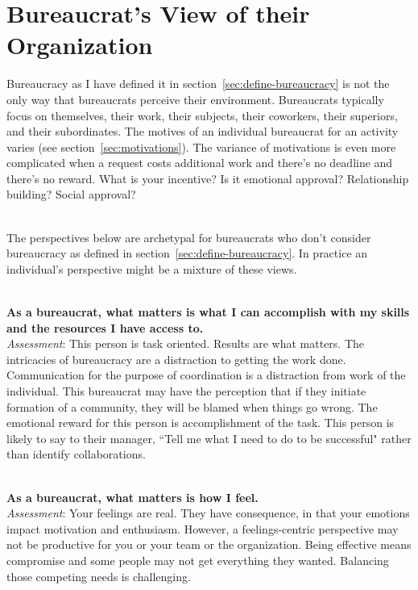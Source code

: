 \section{Bureaucrat's View of their Organization\label{sec:alternative-views-from-within}}

Bureaucracy as I have defined it in section~\ref{sec:define-bureaucracy} is not the only way that bureaucrats perceive their environment. Bureaucrats typically focus on themselves, their work, their subjects, their coworkers, their superiors, and their subordinates. The motives of an individual bureaucrat for an activity varies (see section~\ref{sec:motivations}). The variance of motivations is even more complicated when a request costs additional work and there's no deadline and there's no reward. What is your incentive? Is it emotional approval? Relationship building? Social approval?

\ \\

The perspectives below are archetypal for bureaucrats who don't consider bureaucracy as defined in section~\ref{sec:define-bureaucracy}. In practice an individual's perspective might be a mixture of these views.

\ \\
\textbf{As a bureaucrat, what matters is what I can accomplish with my skills and the resources I have access to.} \\
\textit{Assessment}: This person is task oriented. Results are what matters. The intricacies of bureaucracy are a distraction to getting the work done. 
Communication  for the purpose of coordination is a distraction from work of the individual. 
This bureaucrat may have the perception that if they initiate formation of a community, they will be blamed when things go wrong.
The emotional reward for this person is accomplishment of the task. This person is likely to say to their manager, ``Tell me what I need to do to be successful" rather than identify collaborations.

\ \\
\textbf{As a bureaucrat, what matters is how I feel.} \\
\textit{Assessment}: Your feelings are real. They have consequence, in that your emotions impact motivation and enthusiasm. However, a feelings-centric perspective may not be productive for you or your team or the organization. Being effective means compromise and some people may not get everything they wanted. Balancing those competing needs is challenging.

